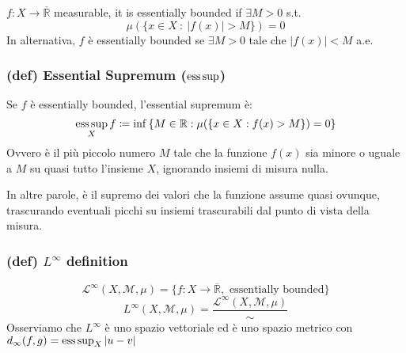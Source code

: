 $f:X\to \overline{\mathbb R}$ measurable, it is essentially bounded if $\exists M>0$ s.t. $$\mu(\{x\in X\ :\ |f(x)|>M\})=0$$
In alternativa, $f$ è essentially bounded se $\exists M>0$ tale che $|f(x)|<M $ a.e.
\subsubsection{(def) Essential Supremum ($\operatorname*{ess\,sup}$)}
Se $f $ è essentially bounded, l'essential supremum è:
$$\operatorname*{ess\,sup}_Xf\coloneqq \inf \left\{ M \in \mathbb{R} : \mu(\{ x \in X : f(x) > M \}) = 0 \right\}$$
Ovvero è il più piccolo numero $M$ tale che la funzione $f(x)$ sia minore o uguale a $M$ su quasi tutto l'insieme $X$, ignorando insiemi di misura nulla.

In altre parole, è il supremo dei valori che la funzione assume quasi ovunque, trascurando eventuali picchi su insiemi trascurabili dal punto di vista della misura.
\subsubsection{(def) $L^\infty$ definition}
$$\mathcal L^\infty(X,\mathcal M,\mu)=\{ f:X\to \overline{\mathbb R}, \text{ essentially bounded}\}$$
$$L^\infty(X,\mathcal M,\mu)=\frac{\mathcal L^\infty(X,\mathcal M,\mu)}\sim$$
Osserviamo che $L^\infty$ è uno spazio vettoriale ed è uno spazio metrico con $d_\infty(f,g)=\operatorname*{ess\,sup}_X|u-v|$
